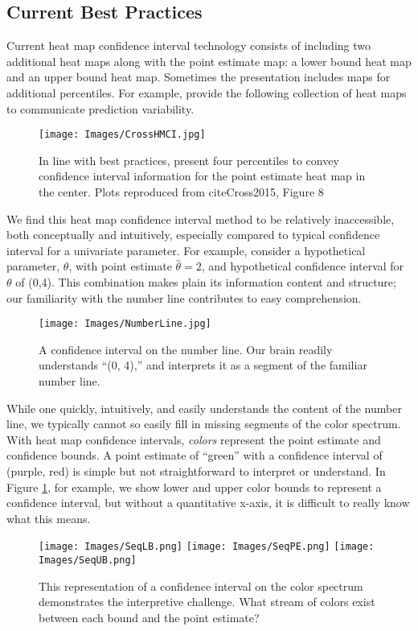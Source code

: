 \subsection{Current Best Practices}

Current heat map confidence interval technology consists of including two additional heat maps along with the point estimate map: a lower bound heat map and an upper bound heat map. Sometimes the presentation includes maps for additional percentiles. For example, \cite{Cross2015} provide the following collection of heat maps to communicate prediction variability.
  \begin{figure}[H]
	\texttt{[image: Images/CrossHMCI.jpg]}
	\caption{In line with best practices, \cite{Cross2015} present four percentiles to convey confidence interval information for the point estimate heat map in the center. Plots reproduced from cite{Cross2015}, Figure 8}
	\end{figure}
We find this heat map confidence interval method to be relatively inaccessible, both conceptually and intuitively, especially compared to typical confidence interval for a univariate parameter. For example, consider a hypothetical parameter, $\theta$, with point estimate $\hat{\theta} = 2$, and hypothetical confidence interval for $\theta$ of (0,4). This combination makes plain its information content and structure; our familiarity with the number line contributes to easy comprehension.
  \begin{figure}[H]
  \centering
	\texttt{[image: Images/NumberLine.jpg]}
	\caption{A confidence interval on the number line. Our brain readily understands ``(0, 4),'' and interprets it as a segment of the familiar number line. } %
	\end{figure}
While one quickly, intuitively, and easily understands the content of the number line, we typically cannot so easily fill in missing segments of the color spectrum. With heat map confidence intervals, {\it colors} represent the point estimate and confidence bounds. A point estimate of ``green'' with a confidence interval of (purple, red) is simple but not straightforward to interpret or understand. In Figure \ref{fig:colorCI}, for example, we show lower and upper color bounds to represent a confidence interval, but without a quantitative x-axis, it is difficult to really know what this means.
  \begin{figure}[H]
  \centering
	\texttt{[image: Images/SeqLB.png]}
	\texttt{[image: Images/SeqPE.png]}
	\texttt{[image: Images/SeqUB.png]}
	\caption{This representation of a confidence interval on the color spectrum demonstrates the interpretive challenge. What stream of colors exist between each bound and the point estimate?}
	\label{fig:colorCI}
	\end{figure}
